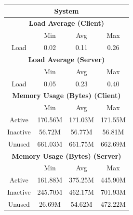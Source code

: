 \documentclass[11pt,a4paper]{scrreprt}
\begin{document}
\begin{table}[H]
\centering
    \begin{tabular}{||c|c|c|c|c|c|c||}
    \hline
    \multicolumn{7}{|c|}{\textbf{System}} \\
    \hline
    \multicolumn{7}{|c|}{\textbf{Load Average (Client)}} \\
    \hline\hline
      & \multicolumn{2}{|c|}{Min} & \multicolumn{2}{|c|}{Avg} & \multicolumn{2}{|c|}{Max} \\
    \hline
    Load & \multicolumn{2}{|c|}{0.02} & \multicolumn{2}{|c|}{0.11} & \multicolumn{2}{|c|}{0.26} \\
    \hline\hline
    \multicolumn{7}{|c|}{\textbf{Load Average (Server)}} \\
    \hline\hline
      & \multicolumn{2}{|c|}{Min} & \multicolumn{2}{|c|}{Avg} & \multicolumn{2}{|c|}{Max} \\
    \hline
    Load & \multicolumn{2}{|c|}{0.05} & \multicolumn{2}{|c|}{0.23} & \multicolumn{2}{|c|}{0.40} \\
    \hline\hline
    \multicolumn{7}{|c|}{\textbf{Memory Usage (Bytes) (Client)}} \\
    \hline\hline
      & \multicolumn{2}{|c|}{Min} & \multicolumn{2}{|c|}{Avg} & \multicolumn{2}{|c|}{Max} \\
    \hline
    Active & \multicolumn{2}{|c|}{170.56M} & \multicolumn{2}{|c|}{171.03M} & \multicolumn{2}{|c|}{171.55M} \\
    \hline
    Inactive & \multicolumn{2}{|c|}{56.72M} & \multicolumn{2}{|c|}{56.77M} & \multicolumn{2}{|c|}{56.81M} \\
    \hline
    Unused & \multicolumn{2}{|c|}{661.03M} & \multicolumn{2}{|c|}{661.75M} & \multicolumn{2}{|c|}{662.69M} \\
    \hline\hline
    \multicolumn{7}{|c|}{\textbf{Memory Usage (Bytes) (Server)}} \\
    \hline\hline
      & \multicolumn{2}{|c|}{Min} & \multicolumn{2}{|c|}{Avg} & \multicolumn{2}{|c|}{Max} \\
    \hline
    Active & \multicolumn{2}{|c|}{161.88M} & \multicolumn{2}{|c|}{375.25M} & \multicolumn{2}{|c|}{445.90M} \\
    \hline
    Inactive & \multicolumn{2}{|c|}{245.70M} & \multicolumn{2}{|c|}{462.17M} & \multicolumn{2}{|c|}{701.93M} \\
    \hline
    Unused & \multicolumn{2}{|c|}{26.69M} & \multicolumn{2}{|c|}{54.62M} & \multicolumn{2}{|c|}{472.22M} \\
    \hline\hline

\end{tabular}
\end{table}
\end{document}
